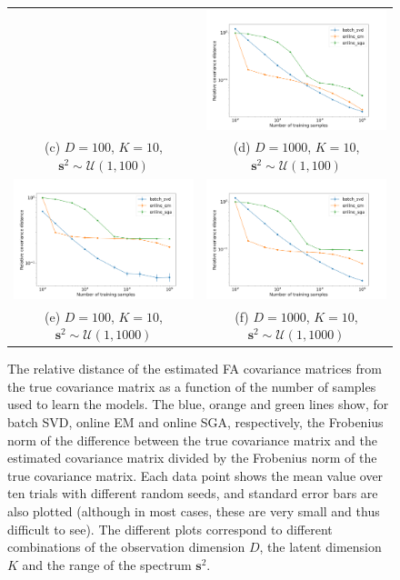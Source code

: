 \documentclass[msc,deptreport.inf]{infthesis} %
\newcommand{\matr}[1]{\mathbf{#1}}
\begin{document}
\begin{figure}[!htbp]
\begin{tabular}{cc}
		 & \includegraphics[width=70mm]{plots/online_fa_covar_distance__observation_dim=1000__latent_dim=10__spectrum_min=1__spectrum_max=100.png} \\
		 (c) $D=100$, $K=10$, $\matr{s}^2 \sim \mathcal{U}(1, 100)$ 
		 & (d) $D=1000$, $K=10$, $\matr{s}^2 \sim \mathcal{U}(1, 100)$\\[6pt]
		 \includegraphics[width=70mm]{plots/online_fa_covar_distance__observation_dim=100__latent_dim=10__spectrum_min=1__spectrum_max=1000.png}
		 & \includegraphics[width=70mm]{plots/online_fa_covar_distance__observation_dim=1000__latent_dim=10__spectrum_min=1__spectrum_max=1000.png} \\
		 (e) $D=100$, $K=10$, $\matr{s}^2 \sim \mathcal{U}(1, 1000)$ 
		 & (f) $D=1000$, $K=10$, $\matr{s}^2 \sim \mathcal{U}(1, 1000)$\\[6pt]
	\end{tabular}
	\caption{The relative distance of the estimated FA covariance matrices from the true covariance matrix as a function of the number of samples used to learn the models. The blue, orange and green lines show, for batch SVD, online EM and online SGA, respectively, the Frobenius norm of the difference between the true covariance matrix and the estimated covariance matrix divided by the Frobenius norm of the true covariance matrix. Each data point shows the mean value over ten trials with different random seeds, and standard error bars are also plotted (although in most cases, these are very small and thus difficult to see). The different plots correspond to different combinations of the observation dimension $D$, the latent dimension $K$ and the range of the spectrum $\matr{s}^2$.} 
	\label{fig:fa_covar_distance}
\end{figure}
\end{document}
